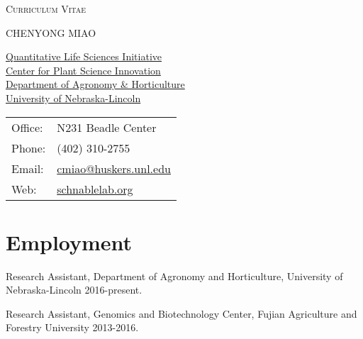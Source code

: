 \documentclass[letterpaper]{article}
\def\name{CHENYONG MIAO}
\renewenvironment{itemize}{
  \begin{list}{}{
    \setlength{\leftmargin}{1.5em}
  }
}{
  \end{list}
}
\begin{document}
\centerline{\huge \textsc{Curriculum Vitae}}
\vspace{0.25in}
\centerline{\huge \textsc{\name}}


\vspace{0.25in}

\begin{minipage}{0.5\linewidth}
  \begin{center}
  \href{http://bigdata.unl.edu/}{Quantitative Life Sciences Initiative}\\
  \href{http://www.unl.edu/psi/}{Center for Plant Science Innovation}\\
  \href{http://agronomy.unl.edu}{Department of Agronomy \& Horticulture}\\
  \href{http://www.unl.edu}{University of Nebraska-Lincoln} \\
\end{center}
\end{minipage}
\begin{minipage}{0.5\linewidth}
  \begin{center}
  \begin{tabular}{ll}
    Office: & N231 Beadle Center \\
    Phone: & (402) 310-2755 \\
    Email: & \href{mailto:cmiao@huskers.unl.edu}{cmiao@huskers.unl.edu} \\
    Web: & \href{http://www.schnablelab.org/}{schnablelab.org} \\
  \end{tabular}
\end{center}
\end{minipage}

\section*{Employment}
\begin{itemize}
\item Research Assistant, Department of Agronomy and Horticulture, University of Nebraska-Lincoln 2016-present.
\item Research Assistant, Genomics and Biotechnology Center, Fujian Agriculture and Forestry University 2013-2016.
\end{itemize}

\end{document}
